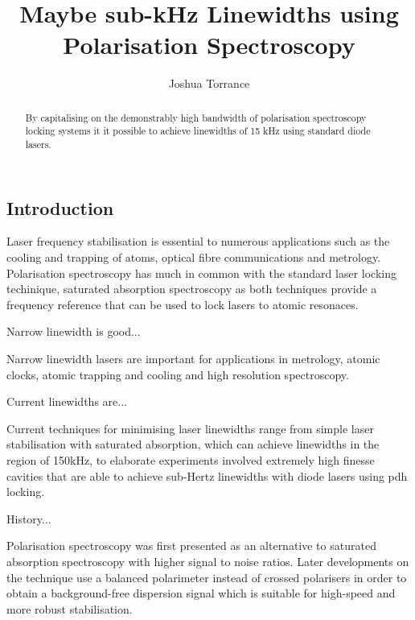 \documentclass{article}
\begin{document}
\title{Maybe sub-kHz Linewidths using Polarisation Spectroscopy}
\author{Joshua Torrance}

\maketitle

\begin{abstract}
By capitalising on the demonstrably high bandwidth of polarisation spectroscopy locking systems it it possible to achieve linewidths of 15 kHz using standard diode lasers.
\end{abstract}

\begin{multicols}{2}

\section{Introduction}
Laser frequency stabilisation is essential to numerous applications such as the cooling and trapping of atoms, optical fibre communications and metrology\cite{metcalf_laser_1999, demtroder_laser_2014}. Polarisation spectroscopy has much in common with the standard laser locking techinique, saturated absorption spectroscopy\cite{maguire_theoretical_2006, haroche_theory_1972, preston_doppler-free_1996} as both techniques provide a frequency reference that can be used to lock lasers to atomic resonaces.

{\color{red}Narrow linewidth is good...}

Narrow linewidth lasers are important for applications in metrology\cite{ye_quantum_2008}, atomic clocks\cite{ludlow_sr_2008}, atomic trapping and cooling\cite{uetake_high_2008, ye_stable_2010, akamatsu_narrow_2012} and high resolution spectroscopy\cite{rafac_sub-dekahertz_2000}.

{\color{red}Current linewidths are...}

Current techniques for minimising laser linewidths range from simple laser stabilisation with saturated absorption, which can achieve linewidths in the region of 150kHz\cite{cuneo_optically_1994}, to elaborate experiments involved extremely high finesse cavities that are able to achieve sub-Hertz linewidths with diode lasers using \gls{pdh} locking.\cite{ludlow_compact_2007}

{\color{red}History...}

Polarisation spectroscopy was first presented as an alternative to saturated absorption spectroscopy with higher signal to noise ratios\cite{wieman_doppler-free_1976}. Later developments on the technique use a balanced polarimeter instead of crossed polarisers in order to obtain a background-free dispersion signal which is suitable for high-speed and more robust stabilisation\cite{yoshikawa_frequency_2003}.


\end{multicols}
\end{document}
